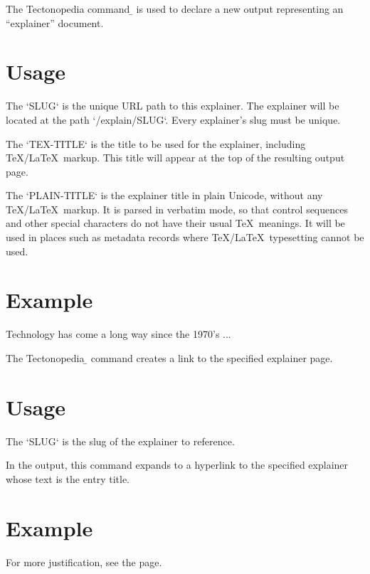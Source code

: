 
The Tectonopedia command \b{\string\Explainer} is used to declare a new output
representing an “explainer” document.

\section*{Usage}

\begin{texdisp}
\end{texdisp}

The \tex`SLUG` is the unique URL path to this explainer. The explainer will be
located at the path \tex`/explain/{SLUG}`. Every explainer's slug must be unique.

The \tex`TEX-TITLE` is the title to be used for the explainer, including
\TeX/\LaTeX\ markup. This title will appear at the top of the resulting output
page.

The \tex`PLAIN-TITLE` is the explainer title in plain Unicode, without any
\TeX/\LaTeX\ markup. It is parsed in verbatim mode, so that control sequences
and other special characters do not have their usual \TeX\ meanings. It will be
used in places such as metadata records where \TeX/\LaTeX\ typesetting cannot be
used.

\section*{Example}

\begin{texdisp}

Technology has come a long way since the 1970's ...
\end{texdisp}


\tduxEmit %



The Tectonopedia \b{\string\explain} command creates a link to the specified
explainer page.

\section*{Usage}

\begin{texdisp}
\end{texdisp}

The \tex`SLUG` is the slug of the explainer to reference.

In the output, this command expands to a hyperlink to the specified explainer whose
text is the entry title.

\section*{Example}

\begin{texdisp}
For more justification, see the  page.
\end{texdisp}
